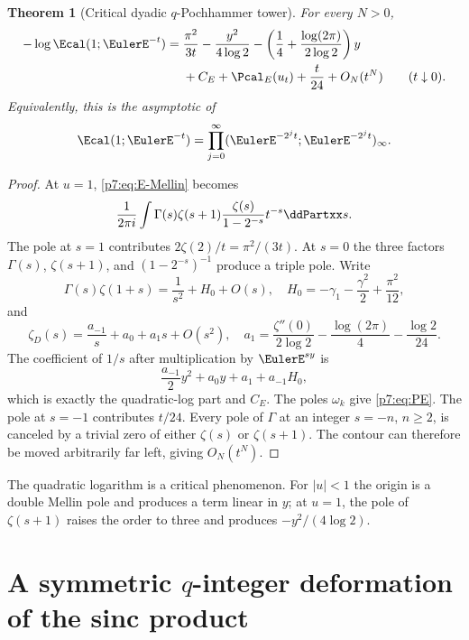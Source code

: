 \documentclass[11pt]{article}
\numberwithin{equation}{section}
\newtheorem{theorem}{Theorem}[section]
\theoremstyle{definition}
\theoremstyle{remark}
\begin{document}
\begin{theorem}[Critical dyadic $q$-Pochhammer tower]\label{p7:thm:E-critical}
For every $N>0$,
\begin{align}\label{p7:eq:E-critical-asymp}
 -\log\Ecal(1;\EulerE^{-t})
 ={}&\frac{\pi^2}{3t}
 -\frac{y^2}{4\log2}
 -\left(\frac14+\frac{\log(2\pi)}{2\log2}\right)y\\
 &+C_E+\Pcal_E(u_t)+\frac{t}{24}+O_N(t^N)
 \qquad(t\downarrow0).\notag
\end{align}
Equivalently, this is the asymptotic of
\begin{equation}\label{p7:eq:E1-tower}
 \Ecal(1;\EulerE^{-t})
 =\prod_{j=0}^{\infty}
 (\EulerE^{-2^jt};\EulerE^{-2^jt})_\infty.
\end{equation}
\end{theorem}

\begin{proof}
At $u=1$, \cref{p7:eq:E-Mellin} becomes
\[
 \frac1{2\pi i}\int
 \Gamma(s)\zeta(s+1)\frac{\zeta(s)}{1-2^{-s}}t^{-s}\ddPartxx s.
\]
The pole at $s=1$ contributes $2\zeta(2)/t=\pi^2/(3t)$.  At $s=0$ the three factors $\Gamma(s)$, $\zeta(s+1)$, and $(1-2^{-s})^{-1}$ produce a triple pole.  Write
\[
 \Gamma(s)\zeta(1+s)
 =\frac1{s^2}+H_0+O(s),
 \quad
 H_0=-\gamma_1-\frac{\gamma^2}{2}+\frac{\pi^2}{12},
\]
and
\[
 \zeta_D(s)=\frac{a_{-1}}s+a_0+a_1s+O(s^2),
 \quad
 a_1=\frac{\zeta''(0)}{2\log2}
 -\frac{\log(2\pi)}4-\frac{\log2}{24}.
\]
The coefficient of $1/s$ after multiplication by $\EulerE^{sy}$ is
\[
 \frac{a_{-1}}2y^2+a_0y+a_1+a_{-1}H_0,
\]
which is exactly the quadratic-log part and $C_E$.  The poles $\omega_k$ give \cref{p7:eq:PE}.  The pole at $s=-1$ contributes $t/24$.  Every pole of $\Gamma$ at an integer $s=-n$, $n\ge2$, is canceled by a trivial zero of either $\zeta(s)$ or $\zeta(s+1)$.  The contour can therefore be moved arbitrarily far left, giving $O_N(t^N)$.
\end{proof}

\begin{remark}
The quadratic logarithm is a critical phenomenon.  For $|u|<1$ the origin is a double Mellin pole and produces a term linear in $y$; at $u=1$, the pole of $\zeta(s+1)$ raises the order to three and produces $-y^2/(4\log2)$.
\end{remark}

\section{A symmetric $q$-integer deformation of the sinc product}
\end{document}
